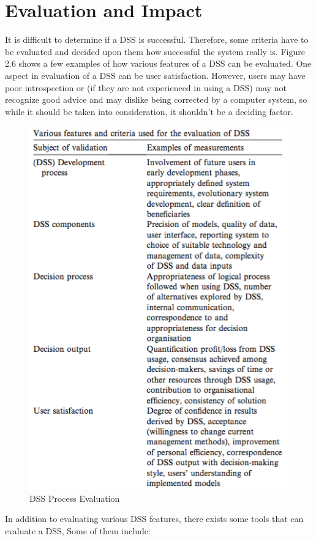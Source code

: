 \section{Evaluation and Impact}
\label{sec:EvaluationAndImpact}
It is difficult to determine if a DSS is successful. Therefore, some criteria have to be evaluated and decided upon them how successful the system really is. Figure 2.6 shows a few examples of how various features of a DSS can be evaluated.\cite{Mysiak2005203} One aspect in evaluation of a DSS can be user satisfaction. However, users may have poor introspection or (if they are not experienced in using a DSS) may not recognize good advice and may dislike being corrected by a computer system, so while it should be taken into consideration, it shouldn't be a deciding factor.\cite{Mysiak2005203}
\begin{figure}[H]
\centering
\includegraphics[scale=0.6]{Images/Evaluation_Features_DSS.png}
\caption[DSS Process Evaluation]{DSS Process Evaluation \cite{Mysiak2005203}}
\end{figure}
In addition to evaluating various DSS features, there exists some tools that can evaluate a DSS, Some of them include:\\
